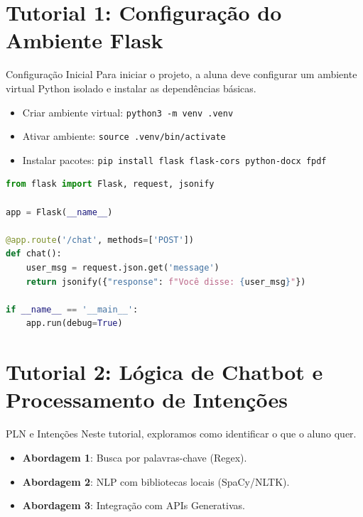 \documentclass[12pt,a4paper]{article}
\begin{document}
\section{Tutorial 1: Configuração do Ambiente Flask}
\label{sec:tut1}

\begin{boxTutorial}{Configuração Inicial}
Para iniciar o projeto, a aluna deve configurar um ambiente virtual Python isolado e instalar as dependências básicas.

\begin{itemize}
    \item Criar ambiente virtual: \texttt{python3 -m venv .venv}
    \item Ativar ambiente: \texttt{source .venv/bin/activate}
    \item Instalar pacotes: \texttt{pip install flask flask-cors python-docx fpdf}
\end{itemize}

\begin{lstlisting}[language=Python]
from flask import Flask, request, jsonify

app = Flask(__name__)

@app.route('/chat', methods=['POST'])
def chat():
    user_msg = request.json.get('message')
    return jsonify({"response": f"Você disse: {user_msg}"})

if __name__ == '__main__':
    app.run(debug=True)
\end{lstlisting}
\end{boxTutorial}

\newpage

\section{Tutorial 2: Lógica de Chatbot e Processamento de Intenções}
\begin{boxTutorial}{PLN e Intenções}
Neste tutorial, exploramos como identificar o que o aluno quer.
\begin{itemize}
    \item \textbf{Abordagem 1}: Busca por palavras-chave (Regex).
    \item \textbf{Abordagem 2}: NLP com bibliotecas locais (SpaCy/NLTK).
    \item \textbf{Abordagem 3}: Integração com APIs Generativas.
\end{itemize}
\end{boxTutorial}
\end{document}
